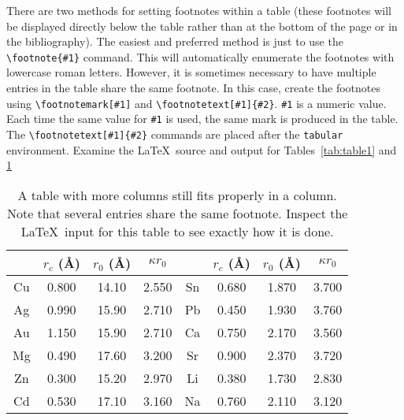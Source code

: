 \documentclass[%
 aip,
 jmp,%
 amsmath,amssymb,
preprint,%
 reprint,%
]{revtex4-2}
\begin{document}
There are two methods for setting footnotes within a table (these
footnotes will be displayed directly below the table rather than at
the bottom of the page or in the bibliography).
The easiest
and preferred method is just to use the \verb+\footnote{#1}+
command. This will automatically enumerate the footnotes with
lowercase roman letters.
However, it is sometimes necessary to have
multiple entries in the table share the same footnote.
In this case,
create the footnotes using
\verb+\footnotemark[#1]+ and \verb+\footnotetext[#1]{#2}+.
\texttt{\#1} is a numeric value.
Each time the same value for \texttt{\#1} is used,
the same mark is produced in the table.
The \verb+\footnotetext[#1]{#2}+ commands are placed after the \texttt{tabular}
environment.
Examine the \LaTeX\ source and output for Tables~\ref{tab:table1} and
\ref{tab:table2}%
\begin{table}
  \caption{\label{tab:table2}A table with more columns still fits
    properly in a column. Note that several entries share the same
    footnote. Inspect the \LaTeX\ input for this table to see
    exactly how it is done.}
  \begin{ruledtabular}
    \begin{tabular}{cccccccc}
         & $r_c$ (\AA) & $r_0$ (\AA) & $\kappa r_0$ &
         & $r_c$ (\AA) & $r_0$ (\AA) & $\kappa r_0$                              \\
      \hline
      Cu & 0.800       & 14.10       & 2.550        & Sn\footnotemark[1]
         & 0.680       & 1.870       & 3.700                                     \\
      Ag & 0.990       & 15.90       & 2.710        & Pb\footnotemark[2]
         & 0.450       & 1.930       & 3.760                                     \\
      Au & 1.150       & 15.90       & 2.710        & Ca\footnotemark[3]
         & 0.750       & 2.170       & 3.560                                     \\
      Mg & 0.490       & 17.60       & 3.200        & Sr\footnotemark[4]
         & 0.900       & 2.370       & 3.720                                     \\
      Zn & 0.300       & 15.20       & 2.970        & Li\footnotemark[2]
         & 0.380       & 1.730       & 2.830                                     \\
      Cd & 0.530       & 17.10       & 3.160        & Na\footnotemark[5]
         & 0.760       & 2.110       & 3.120                                     \\

\end{tabular}
\end{ruledtabular}
\end{table}
\end{document}
